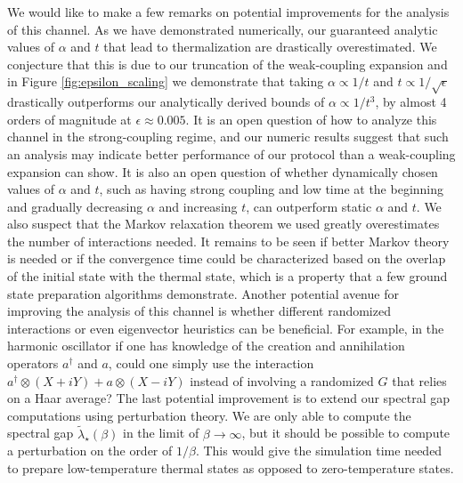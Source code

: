We would like to make a few remarks on potential improvements for the analysis of this channel. As we have demonstrated numerically, our guaranteed analytic values of $\alpha$ and $t$ that lead to thermalization are drastically overestimated. We conjecture that this is due to our truncation of the weak-coupling expansion and in Figure \ref{fig:epsilon_scaling} we demonstrate that taking $\alpha \propto 1/t$ and $t \propto 1/ \sqrt{\epsilon}$ drastically outperforms our analytically derived bounds of $\alpha \propto 1/t^3$, by almost 4 orders of magnitude at $\epsilon \approx 0.005$. It is an open question of how to analyze this channel in the strong-coupling regime, and our numeric results suggest that such an analysis may indicate better performance of our protocol than a weak-coupling expansion can show. It is also an open question of whether dynamically chosen values of $\alpha$ and $t$, such as having strong coupling and low time at the beginning and gradually decreasing $\alpha$ and increasing $t$, can outperform static $\alpha$ and $t$. We also suspect that the Markov relaxation theorem we used greatly overestimates the number of interactions needed. It remains to be seen if better Markov theory is needed or if the convergence time could be characterized based on the overlap of the initial state with the thermal state, which is a property that a few ground state preparation algorithms demonstrate. Another potential avenue for improving the analysis of this channel is whether different randomized interactions or even eigenvector heuristics can be beneficial. For example, in the harmonic oscillator if one has knowledge of the creation and annihilation operators $a^\dagger$ and $a$, could one simply use the interaction $a^\dagger \otimes (X + i Y) + a \otimes (X - i Y)$ instead of involving a randomized $G$ that relies on a Haar average? The last potential improvement is to extend our spectral gap computations using perturbation theory. We are only able to compute the spectral gap $\widetilde{\lambda}_\star(\beta)$ in the limit of $\beta \to \infty$, but it should be possible to compute a perturbation on the order of $1/\beta$. This would give the simulation time needed to prepare low-temperature thermal states as opposed to zero-temperature states.

